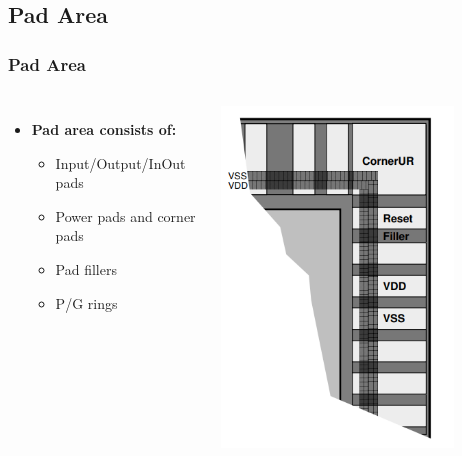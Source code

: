 \documentclass[compress]{beamer}
\begin{document}
\subsection[PAD]{Pad Area}
\begin{frame}
	\frametitle{Pad Area}
	\begin{columns}	
		\begin{itemize}
			\item \textbf{Pad area consists of:}
				\begin{itemize}
					\item Input/Output/InOut pads
					\item Power pads and corner pads
					\item Pad fillers
					\item P/G rings
				\end{itemize}
		\end{itemize}
		\begin{center}
			\includegraphics[width=0.8\textwidth]{pad}
		\end{center}
	\end{columns}
\end{frame}
\end{document}
